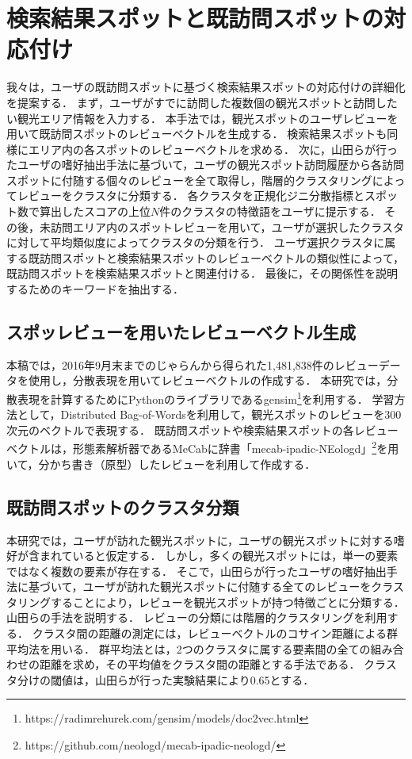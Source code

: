 \documentclass{deimj}
\begin{document}
\section{検索結果スポットと既訪問スポットの対応付け}
\label{sec:検索結果スポットと既訪問スポットの対応付け}
我々は，ユーザの既訪問スポットに基づく検索結果スポットの対応付けの詳細化を提案する．
まず，ユーザがすでに訪問した複数個の観光スポットと訪問したい観光エリア情報を入力する．
本手法では，観光スポットのユーザレビューを用いて既訪問スポットのレビューベクトルを生成する．
検索結果スポットも同様にエリア内の各スポットのレビューベクトルを求める．
次に，山田ら\cite{山田}が行ったユーザの嗜好抽出手法に基づいて，ユーザの観光スポット訪問履歴から各訪問スポットに付随する個々のレビューを全て取得し，階層的クラスタリングによってレビューをクラスタに分類する．
各クラスタを正規化ジニ分散指標とスポット数で算出したスコアの上位$N$件のクラスタの特徴語をユーザに提示する．
その後，未訪問エリア内のスポットレビューを用いて，ユーザが選択したクラスタに対して平均類似度によってクラスタの分類を行う．
ユーザ選択クラスタに属する既訪問スポットと検索結果スポットのレビューベクトルの類似性によって，既訪問スポットを検索結果スポットと関連付ける．
最後に，その関係性を説明するためのキーワードを抽出する．
\subsection{スポッレビューを用いたレビューベクトル生成}
本稿では，2016年9月末までのじゃらんから得られた1,481,838件のレビューデータを使用し，分散表現\cite{doc2vec}を用いてレビューベクトルの作成する．
本研究では，分散表現を計算するためにPythonのライブラリであるgensim\footnote{https://radimrehurek.com/gensim/models/doc2vec.html}を利用する．
学習方法として，Distributed Bag-of-Wordsを利用して，観光スポットのレビューを300次元のベクトルで表現する．
既訪問スポットや検索結果スポットの各レビューベクトルは，形態素解析器であるMeCab\cite{mecab}に辞書「mecab-ipadic-NEologd」\footnote{https://github.com/neologd/mecab-ipadic-neologd/}を用いて，分かち書き（原型）したレビューを利用して作成する．
\subsection{既訪問スポットのクラスタ分類}
\label{sub:既訪問スポットのクラスタ分類}
本研究では，ユーザが訪れた観光スポットに，ユーザの観光スポットに対する嗜好が含まれていると仮定する．
しかし，多くの観光スポットには，単一の要素ではなく複数の要素が存在する．
そこで，山田ら\cite{山田}が行ったユーザの嗜好抽出手法に基づいて，ユーザが訪れた観光スポットに付随する全てのレビューをクラスタリングすることにより，レビューを観光スポットが持つ特徴ごとに分類する．
山田らの手法を説明する．
レビューの分類には階層的クラスタリングを利用する．
クラスタ間の距離の測定には，レビューベクトルのコサイン距離による群平均法を用いる．
群平均法とは，2つのクラスタに属する要素間の全ての組み合わせの距離を求め，その平均値をクラスタ間の距離とする手法である．
クラスタ分けの閾値は，山田らが行った実験結果により0.65とする．
\end{document}
